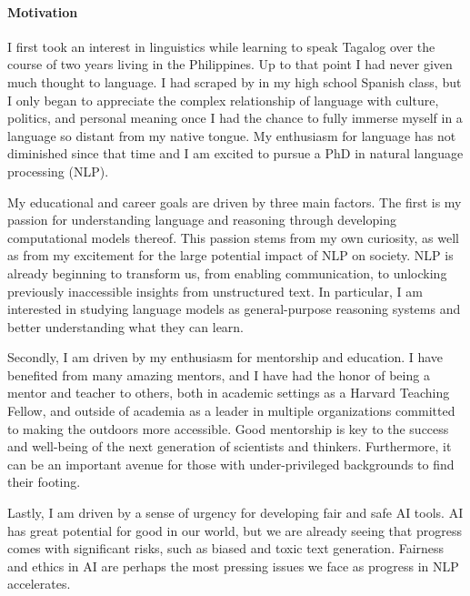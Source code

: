 \documentclass[11pt]{article}
\begin{document}
\paragraph{Motivation}

I first took an interest in linguistics 
while learning to speak Tagalog 
over the course of two years living in the Philippines. 
Up to that point I had never given much thought to language. 
I had scraped by in my high school Spanish class, 
but I only began to appreciate the complex relationship of language 
with culture, politics, and personal meaning 
once I had the chance to fully immerse myself in a language 
so distant from my native tongue.
My enthusiasm for language has not diminished since that time
and I am excited to pursue a PhD in natural language processing (NLP).

My educational and career goals are driven by three main factors.
The first is my passion for understanding language and reasoning
through developing computational models thereof.
This passion stems from my own curiosity,
as well as from my excitement for 
the large potential impact of NLP on society.
NLP is already beginning to transform us,
from enabling communication, 
to unlocking previously inaccessible insights from unstructured text. 
In particular, I am interested in studying language models
as general-purpose reasoning systems and better understanding 
what they can learn.

Secondly, I am driven by my enthusiasm for mentorship and education.
I have benefited from many amazing mentors, 
and I have had the honor of being a mentor and teacher to others, 
both in academic settings as a Harvard Teaching Fellow,
and outside of academia as a leader in multiple organizations 
committed to making the outdoors more accessible.
Good mentorship is key to the success 
and well-being of the next generation of scientists and thinkers. 
Furthermore, it can be an important avenue 
for those with under-privileged backgrounds to find their footing.

Lastly, I am driven by a sense of urgency for developing fair and safe AI tools.
AI has great potential for good in our world, 
but we are already seeing that progress comes with significant risks,
such as biased and toxic text generation.
Fairness and ethics in AI are perhaps the most pressing issues 
we face as progress in NLP accelerates.
\end{document}
